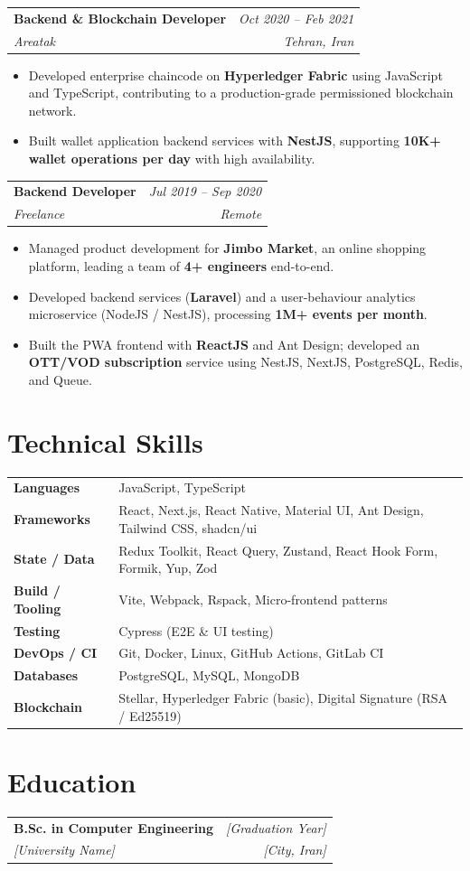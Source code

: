\documentclass[10pt, a4paper]{article}
\makeatletter
\newcommand{\resumeEntry}[4]{%
  \noindent
  \begin{tabularx}{\textwidth}{@{}X r@{}}
    \textbf{\large #1} & \textit{\small\color{medgray}#2}\\[1pt]
    \textcolor{accent}{\textit{#3}} & \textit{\small\color{medgray}#4}
  \end{tabularx}
  \vspace{3pt}
}
\newcommand{\separator}{\vspace{7pt}}
\makeatother
\begin{document}
\resumeEntry{Backend \& Blockchain Developer}{Oct 2020 -- Feb 2021}%
{Areatak}{Tehran, Iran}

\begin{itemize}
  \item Developed enterprise chaincode on \textbf{Hyperledger Fabric} using JavaScript and
        TypeScript, contributing to a production-grade permissioned blockchain network.
  \item Built wallet application backend services with \textbf{NestJS}, supporting
        \textbf{10K+ wallet operations per day} with high availability.
\end{itemize}

\separator

\resumeEntry{Backend Developer}{Jul 2019 -- Sep 2020}%
{Freelance}{Remote}

\begin{itemize}
  \item Managed product development for \textbf{Jimbo Market}, an online shopping platform,
        leading a team of \textbf{4+ engineers} end-to-end.
  \item Developed backend services (\textbf{Laravel}) and a user-behaviour analytics
        microservice (NodeJS / NestJS), processing \textbf{1M+ events per month}.
  \item Built the PWA frontend with \textbf{ReactJS} and Ant Design; developed an
        \textbf{OTT/VOD subscription} service using NestJS, NextJS, PostgreSQL, Redis, and Queue.
\end{itemize}

\section{Technical Skills}

\renewcommand{\arraystretch}{1.4}
\begin{tabularx}{\textwidth}{@{} >{\bfseries}p{3cm} X @{}}
  Languages       & JavaScript, TypeScript \\
  Frameworks      & React, Next.js, React Native, Material UI, Ant Design, Tailwind CSS, shadcn/ui \\
  State / Data    & Redux Toolkit, React Query, Zustand, React Hook Form, Formik, Yup, Zod \\
  Build / Tooling & Vite, Webpack, Rspack, Micro-frontend patterns \\
  Testing         & Cypress (E2E \& UI testing) \\
  DevOps / CI     & Git, Docker, Linux, GitHub Actions, GitLab CI \\
  Databases       & PostgreSQL, MySQL, MongoDB \\
  Blockchain      & Stellar, Hyperledger Fabric (basic), Digital Signature (RSA / Ed25519) \\
\end{tabularx}

\section{Education}

\resumeEntry{B.Sc. in Computer Engineering}{[Graduation Year]}%
{[University Name]}{[City, Iran]}

\end{document}
